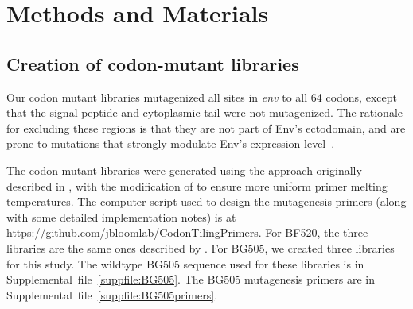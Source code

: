 \documentclass[9pt]{elife}
\begin{document}
\clearpage
\section{Methods and Materials}

\subsection{Creation of codon-mutant libraries}
Our codon mutant libraries mutagenized all sites in \textit{env} to all 64 codons, except that the signal peptide and cytoplasmic tail were not mutagenized.
The rationale for excluding these regions is that they are not part of Env's ectodomain, and are prone to mutations that strongly modulate Env's expression level~\citep{chakrabarti1989cytoplasmic,yuste2004modulation,li1994control}.

The codon-mutant libraries were generated using the approach originally described in \citet{bloom2014experimentally}, with the modification of \citet{dingens2017comprehensive} to ensure more uniform primer melting temperatures.
The computer script used to design the mutagenesis primers (along with some detailed implementation notes) is at \url{https://github.com/jbloomlab/CodonTilingPrimers}.
For BF520, the three libraries are the same ones described by \citet{dingens2017comprehensive}.
For BG505, we created three libraries for this study.
The wildtype BG505 sequence used for these libraries is in Supplemental~file~\ref{suppfile:BG505}.
The BG505 mutagenesis primers are in Supplemental~file~\ref{suppfile:BG505primers}.
\end{document}
